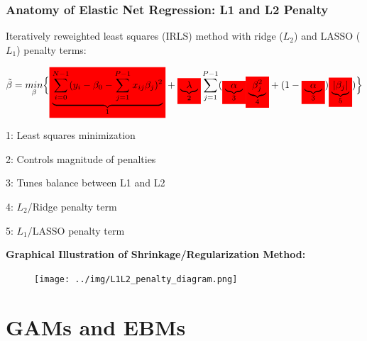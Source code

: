 \documentclass[11pt,aspectratio=169,hyperref={colorlinks}]{beamer}
\newcommand{\mathcolorbox}[2]{\colorbox{#1}{$\displaystyle #2$}}
\begin{document}
		\begin{frame}
		
			\frametitle{Anatomy of Elastic Net Regression: L1 and L2 Penalty}			
		Iteratively reweighted least squares (IRLS) method with ridge ($L_2$) and LASSO ($L_1$) penalty terms: 
			
			\begin{equation}
				\label{eq:Elastic_Net}
				\begin{aligned}
				\tilde{\beta}= \underset{\beta}{min}\Big\{ \mathcolorbox{red}{ \underbrace{\sum_{i=0}^{N-1}(y_i-\beta_0-\sum_{j=1}^{P-1} x_{ij} \beta_{j})^2}_\text{1}} + \mathcolorbox{red}{\underbrace{\lambda}_\text{2}} \sum_{j=1}^{P-1} ( \mathcolorbox{red}{\underbrace{\alpha}_\text{3}} \mathcolorbox{red}{\underbrace{\beta_j^2}_\text{4}} + (1-\mathcolorbox{red}{\underbrace{\alpha}_\text{3}}) \mathcolorbox{red}{\underbrace{|\beta_{j}|}_\text{5}}) \Big\}
				\end{aligned}
			\end{equation}		
			
			\begin{itemize}
			\scriptsize{
				\item{1: Least squares minimization}
				\item{2: Controls magnitude of penalties}
				\item{3: Tunes balance between L1 and L2}
				\item{4: $L_2$/Ridge penalty term}
				\item{5: $L_1$/LASSO penalty term}}
			\end{itemize}
						
		\end{frame}
	
		\begin{frame}
			
			\textbf{Graphical Illustration of Shrinkage/Regularization Method:} 
			
			\begin{figure}[htb]
				\begin{center}
					\texttt{[image: ../img/L1L2\_penalty\_diagram.png]}
					\label{fig:L1L2}
				\end{center}
			\end{figure}
								
		\end{frame}				

	\section{GAMs and EBMs}
\end{document}
